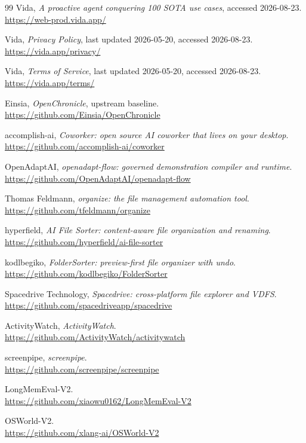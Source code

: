 \documentclass[UTF8,fontset=none,zihao=-4,openany]{ctexrep}
\begin{document}
\begin{thebibliography}{99}
Vida, \emph{A proactive agent conquering 100 SOTA use cases}, accessed 2026-08-23.\\
\url{https://web-prod.vida.app/}

Vida, \emph{Privacy Policy}, last updated 2026-05-20, accessed 2026-08-23.\\
\url{https://vida.app/privacy/}

Vida, \emph{Terms of Service}, last updated 2026-05-20, accessed 2026-08-23.\\
\url{https://vida.app/terms/}

Einsia, \emph{OpenChronicle}, upstream baseline.\\
\url{https://github.com/Einsia/OpenChronicle}

accomplish-ai, \emph{Coworker: open source AI coworker that lives on your desktop}.\\
\url{https://github.com/accomplish-ai/coworker}

OpenAdaptAI, \emph{openadapt-flow: governed demonstration compiler and runtime}.\\
\url{https://github.com/OpenAdaptAI/openadapt-flow}

Thomas Feldmann, \emph{organize: the file management automation tool}.\\
\url{https://github.com/tfeldmann/organize}

hyperfield, \emph{AI File Sorter: content-aware file organization and renaming}.\\
\url{https://github.com/hyperfield/ai-file-sorter}

kodlbegiko, \emph{FolderSorter: preview-first file organizer with undo}.\\
\url{https://github.com/kodlbegiko/FolderSorter}

Spacedrive Technology, \emph{Spacedrive: cross-platform file explorer and VDFS}.\\
\url{https://github.com/spacedriveapp/spacedrive}

ActivityWatch, \emph{ActivityWatch}.\\
\url{https://github.com/ActivityWatch/activitywatch}

screenpipe, \emph{screenpipe}.\\
\url{https://github.com/screenpipe/screenpipe}

LongMemEval-V2.\\
\url{https://github.com/xiaowu0162/LongMemEval-V2}

OSWorld-V2.\\
\url{https://github.com/xlang-ai/OSWorld-V2}
\end{thebibliography}
\end{document}
